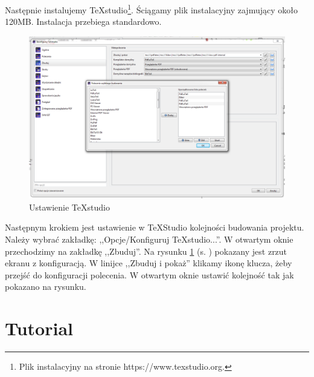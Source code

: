 Następnie instalujemy \TeX{}studio\footnote{Plik instalacyjny na stronie  https://www.texstudio.org\cite{www3}.}. Ściągamy plik instalacyjny zajmujący około 120MB. Instalacja przebiega standardowo.

\begin{figure}[!hbt]
	\begin{center}
		\includegraphics[width=\linewidth]{rys/ustawienie.png}
		\caption{Ustawienie TeXstudio}
		\label{rys:ustawienia}
	\end{center}
\end{figure}

Następnym krokiem jest ustawienie w \TeX{}Studio kolejności budowania projektu. Należy wybrać zakładkę: ,,Opcje/Konfiguruj \TeX{}studio...''. W otwartym oknie przechodzimy na zakładkę ,,Zbuduj''. Na rysunku \ref{rys:ustawienia} (s. \pageref{rys:ustawienia}) pokazany jest zrzut ekranu z konfiguracją. W linijce ,,Zbuduj i pokaż'' klikamy ikonę klucza, żeby przejść do konfiguracji polecenia. W otwartym oknie ustawić kolejność tak jak pokazano na rysunku.

 
 
 
 

\newpage
\section*{Tutorial}		%

